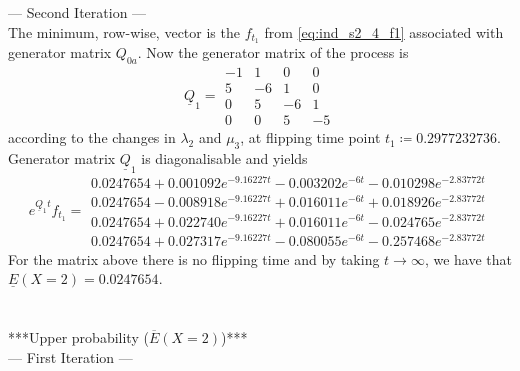 \documentclass{article}
\begin{document}
--- Second Iteration ---\\
The minimum, row-wise, vector is the $f_{t_1}$ from \eqref{eq:ind_s2_4_f1} associated with generator matrix $Q_{0a}$.
Now the generator matrix of the process is
\begin{equation*} 
 \underline{Q}_{1}= 
 \begin{array}{|rrrr|}
  -1 & 1 & 0 & 0 \\
  5 & -6 & 1 & 0 \\
  0 & 5 & -6 & 1 \\
  0 & 0 & 5 & -5 
 \end{array}
 \end{equation*}
according to the changes in $\lambda_{2}$ and $\mu_{3}$, at flipping time point $t_{1}\coloneqq 0.2977232736$.
Generator matrix $\underline{Q}_1$ is diagonalisable and yields 
\begin{equation*} 
 e^{\underline{Q}_{1}t}f_{t_1}= 
 \begin{array}{|r|}
 0.0247654+0.001092e^{-9.16227t}-0.003202e^{-6t}-0.010298e^{-2.83772t}\\
 0.0247654-0.008918e^{-9.16227t}+0.016011e^{-6t}+0.018926e^{-2.83772t}\\
 0.0247654+0.022740e^{-9.16227t}+0.016011e^{-6t}-0.024765e^{-2.83772t}\\
 0.0247654+0.027317e^{-9.16227t}-0.080055e^{-6t}-0.257468e^{-2.83772t}  
 \end{array}
 \end{equation*}
For the matrix above there is no flipping time and by taking $t\to\infty$, we have that
$\underline{E}(X=2) = 0.0247654$.\\\\\\

***Upper probability ($\overline{E}(X=2)$)***\\

--- First Iteration ---
\end{document}
